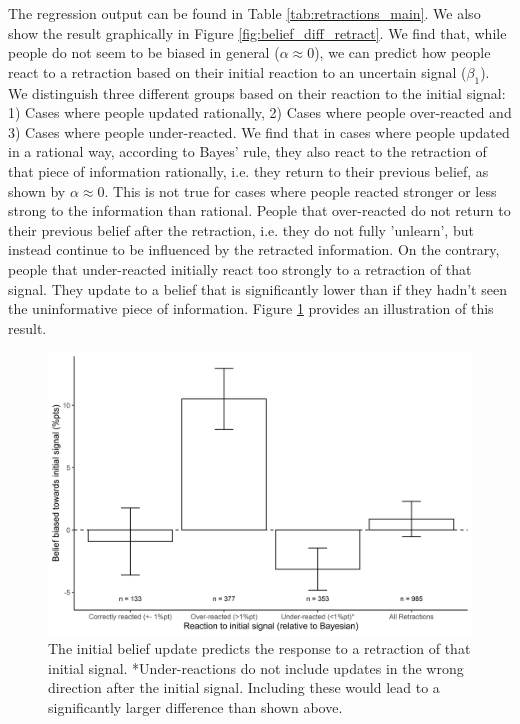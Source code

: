 \documentclass{article}
\begin{document}
The regression output can be found in Table \ref{tab:retractions_main}. We also show the result graphically in Figure \ref{fig:belief_diff_retract}. We find that, while people do not seem to be biased in general ($\alpha\approx0$), we can predict how people react to a retraction based on their initial reaction to an uncertain signal ($\beta_1$). We distinguish three different groups based on their reaction to the initial signal: 1) Cases where people updated rationally, 2) Cases where people over-reacted and 3) Cases where people under-reacted. We find that in cases where people updated in a rational way, according to Bayes' rule, they also react to the retraction of that piece of information rationally, i.e. they return to their previous belief, as shown by $\alpha\approx 0$. This is not true for cases where people reacted stronger or less strong to the information than rational. People that over-reacted do not return to their previous belief after the retraction, i.e. they do not fully 'unlearn', but instead continue to be influenced by the retracted information. On the contrary, people that under-reacted initially react too strongly to a retraction of that signal. They update to a belief that is significantly lower than if they hadn't seen the uninformative piece of information. Figure \ref{fig:retraction_result_main} provides an illustration of this result.

\begin{figure}[!htb]
    \centering
    \includegraphics[width = 12cm]{Fig/02_fig_retract_diff_group.jpg}
    \caption{The initial belief update predicts the response to a retraction of that initial signal. *Under-reactions do not include updates in the wrong direction after the initial signal. Including these would lead to a significantly larger difference than shown above.}
    \label{fig:retraction_result_main}
\end{figure}
\end{document}
